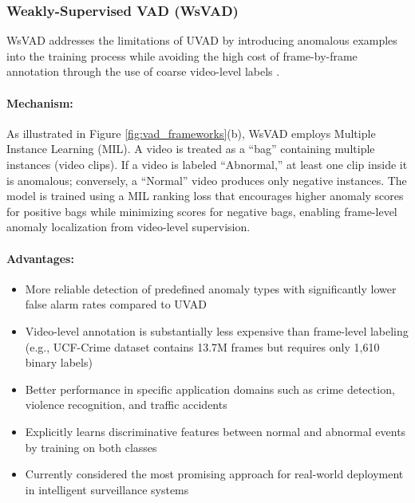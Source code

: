 \documentclass[12pt]{article}
\begin{document}
\subsubsection{Weakly-Supervised VAD (WsVAD)}
WsVAD addresses the limitations of UVAD by introducing anomalous examples into the training process while avoiding the high cost of frame-by-frame annotation through the use of coarse video-level labels \citep{sultani2018real}.

\paragraph{Mechanism:} 
As illustrated in Figure \ref{fig:vad_frameworks}(b), WsVAD employs Multiple Instance Learning (MIL). A video is treated as a ``bag'' containing multiple instances (video clips). If a video is labeled ``Abnormal,'' at least one clip inside it is anomalous; conversely, a ``Normal'' video produces only negative instances. The model is trained using a MIL ranking loss that encourages higher anomaly scores for positive bags while minimizing scores for negative bags, enabling frame-level anomaly localization from video-level supervision.

\paragraph{Advantages:}
\begin{itemize}
    \item More reliable detection of predefined anomaly types with significantly lower false alarm rates compared to UVAD
    \item Video-level annotation is substantially less expensive than frame-level labeling (e.g., UCF-Crime dataset contains 13.7M frames but requires only 1,610 binary labels)
    \item Better performance in specific application domains such as crime detection, violence recognition, and traffic accidents
    \item Explicitly learns discriminative features between normal and abnormal events by training on both classes
    \item Currently considered the most promising approach for real-world deployment in intelligent surveillance systems \citep{sultani2018real, liu2024networking}
\end{itemize}
\end{document}
